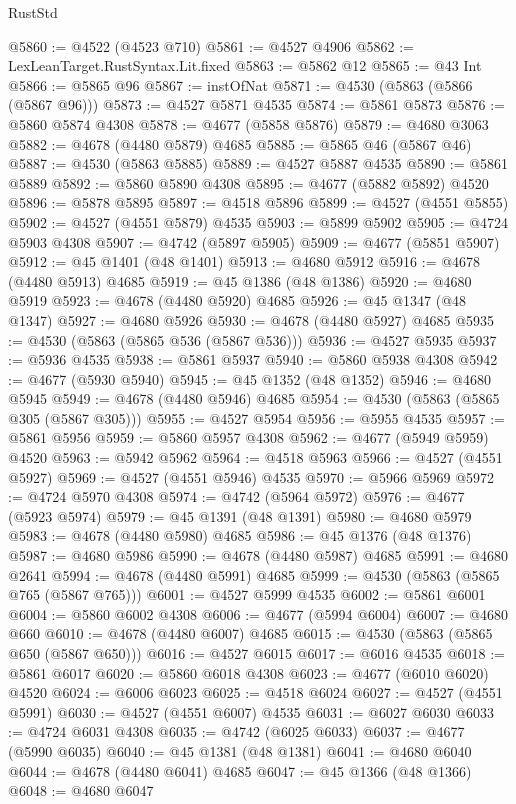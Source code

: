 \begin{lexlean}{RustStd}
\begin{coremodule}
@5860 := @4522 (@4523 @710)
@5861 := @4527 @4906
@5862 := LexLeanTarget.RustSyntax.Lit.fixed
@5863 := @5862 @12
@5865 := @43 Int
@5866 := @5865 @96
@5867 := instOfNat
@5871 := @4530 (@5863 (@5866 (@5867 @96)))
@5873 := @4527 @5871 @4535
@5874 := @5861 @5873
@5876 := @5860 @5874 @4308
@5878 := @4677 (@5858 @5876)
@5879 := @4680 @3063
@5882 := @4678 (@4480 @5879) @4685
@5885 := @5865 @46 (@5867 @46)
@5887 := @4530 (@5863 @5885)
@5889 := @4527 @5887 @4535
@5890 := @5861 @5889
@5892 := @5860 @5890 @4308
@5895 := @4677 (@5882 @5892) @4520
@5896 := @5878 @5895
@5897 := @4518 @5896
@5899 := @4527 (@4551 @5855)
@5902 := @4527 (@4551 @5879) @4535
@5903 := @5899 @5902
@5905 := @4724 @5903 @4308
@5907 := @4742 (@5897 @5905)
@5909 := @4677 (@5851 @5907)
@5912 := @45 @1401 (@48 @1401)
@5913 := @4680 @5912
@5916 := @4678 (@4480 @5913) @4685
@5919 := @45 @1386 (@48 @1386)
@5920 := @4680 @5919
@5923 := @4678 (@4480 @5920) @4685
@5926 := @45 @1347 (@48 @1347)
@5927 := @4680 @5926
@5930 := @4678 (@4480 @5927) @4685
@5935 := @4530 (@5863 (@5865 @536 (@5867 @536)))
@5936 := @4527 @5935
@5937 := @5936 @4535
@5938 := @5861 @5937
@5940 := @5860 @5938 @4308
@5942 := @4677 (@5930 @5940)
@5945 := @45 @1352 (@48 @1352)
@5946 := @4680 @5945
@5949 := @4678 (@4480 @5946) @4685
@5954 := @4530 (@5863 (@5865 @305 (@5867 @305)))
@5955 := @4527 @5954
@5956 := @5955 @4535
@5957 := @5861 @5956
@5959 := @5860 @5957 @4308
@5962 := @4677 (@5949 @5959) @4520
@5963 := @5942 @5962
@5964 := @4518 @5963
@5966 := @4527 (@4551 @5927)
@5969 := @4527 (@4551 @5946) @4535
@5970 := @5966 @5969
@5972 := @4724 @5970 @4308
@5974 := @4742 (@5964 @5972)
@5976 := @4677 (@5923 @5974)
@5979 := @45 @1391 (@48 @1391)
@5980 := @4680 @5979
@5983 := @4678 (@4480 @5980) @4685
@5986 := @45 @1376 (@48 @1376)
@5987 := @4680 @5986
@5990 := @4678 (@4480 @5987) @4685
@5991 := @4680 @2641
@5994 := @4678 (@4480 @5991) @4685
@5999 := @4530 (@5863 (@5865 @765 (@5867 @765)))
@6001 := @4527 @5999 @4535
@6002 := @5861 @6001
@6004 := @5860 @6002 @4308
@6006 := @4677 (@5994 @6004)
@6007 := @4680 @660
@6010 := @4678 (@4480 @6007) @4685
@6015 := @4530 (@5863 (@5865 @650 (@5867 @650)))
@6016 := @4527 @6015
@6017 := @6016 @4535
@6018 := @5861 @6017
@6020 := @5860 @6018 @4308
@6023 := @4677 (@6010 @6020) @4520
@6024 := @6006 @6023
@6025 := @4518 @6024
@6027 := @4527 (@4551 @5991)
@6030 := @4527 (@4551 @6007) @4535
@6031 := @6027 @6030
@6033 := @4724 @6031 @4308
@6035 := @4742 (@6025 @6033)
@6037 := @4677 (@5990 @6035)
@6040 := @45 @1381 (@48 @1381)
@6041 := @4680 @6040
@6044 := @4678 (@4480 @6041) @4685
@6047 := @45 @1366 (@48 @1366)
@6048 := @4680 @6047

\end{coremodule}
\end{lexlean}
